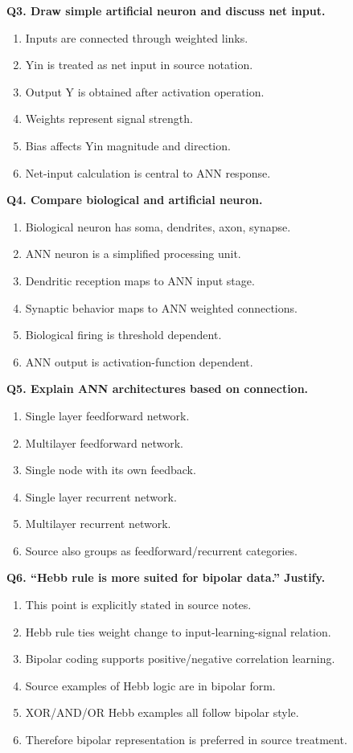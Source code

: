 \documentclass[11pt,a4paper]{article}
\begin{document}
\textbf{Q3. Draw simple artificial neuron and discuss net input.}
\begin{enumerate}
\item Inputs are connected through weighted links.
\item Yin is treated as net input in source notation.
\item Output Y is obtained after activation operation.
\item Weights represent signal strength.
\item Bias affects Yin magnitude and direction.
\item Net-input calculation is central to ANN response.
\end{enumerate}

\textbf{Q4. Compare biological and artificial neuron.}
\begin{enumerate}
\item Biological neuron has soma, dendrites, axon, synapse.
\item ANN neuron is a simplified processing unit.
\item Dendritic reception maps to ANN input stage.
\item Synaptic behavior maps to ANN weighted connections.
\item Biological firing is threshold dependent.
\item ANN output is activation-function dependent.
\end{enumerate}

\textbf{Q5. Explain ANN architectures based on connection.}
\begin{enumerate}
\item Single layer feedforward network.
\item Multilayer feedforward network.
\item Single node with its own feedback.
\item Single layer recurrent network.
\item Multilayer recurrent network.
\item Source also groups as feedforward/recurrent categories.
\end{enumerate}

\textbf{Q6. ``Hebb rule is more suited for bipolar data.'' Justify.}
\begin{enumerate}
\item This point is explicitly stated in source notes.
\item Hebb rule ties weight change to input-learning-signal relation.
\item Bipolar coding supports positive/negative correlation learning.
\item Source examples of Hebb logic are in bipolar form.
\item XOR/AND/OR Hebb examples all follow bipolar style.
\item Therefore bipolar representation is preferred in source treatment.
\end{enumerate}
\end{document}
